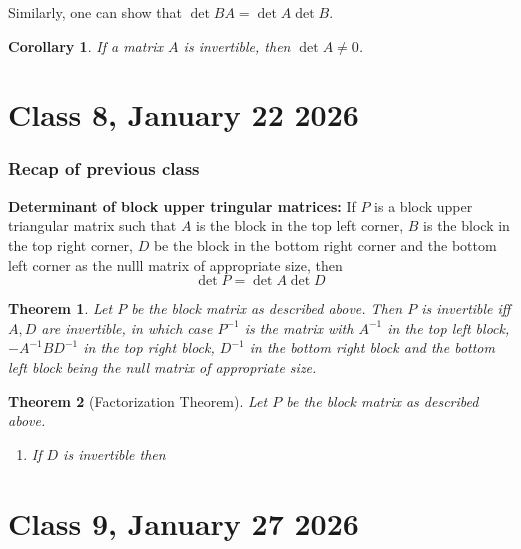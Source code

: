 \documentclass{article}
\newtheorem{theorem}{Theorem}
\newtheorem{corollary}{Corollary}
\begin{document}
Similarly, one can show that $\det{BA}=\det{A}\det{B}$. 
\begin{corollary}
 If a matrix $A$ is invertible, then $\det{A}\neq 0$.   
\end{corollary}
\section*{Class 8, January 22 2026}
\subsubsection*{Recap of previous class}
\textbf{Determinant of block upper tringular matrices:} If $P$ is a block upper triangular matrix such that $A$ is the block in the top left corner, $B$ is the block in the top right corner, $D$ be the block in the bottom right corner and the bottom left corner as the nulll matrix of appropriate size, then 
$$\det{P}=\det{A}\det{D}$$
\begin{theorem}
    Let $P$ be the block matrix as described above. Then $P$ is invertible iff $A,D$ are invertible, in which case $P^{-1}$ is the matrix with $A^{-1}$ in the top left block, $-A^{-1}BD^{-1}$ in the top right block, $D^{-1}$ in the bottom right block and the bottom left block being the null matrix of appropriate size.
\end{theorem}
\begin{theorem}[Factorization Theorem]
    Let $P$ be the block matrix as described above. 
    \begin{enumerate}
        \item If $D$ is invertible then 
        
    \end{enumerate} 
    
\end{theorem}
\section*{Class 9, January 27 2026}
\end{document}
